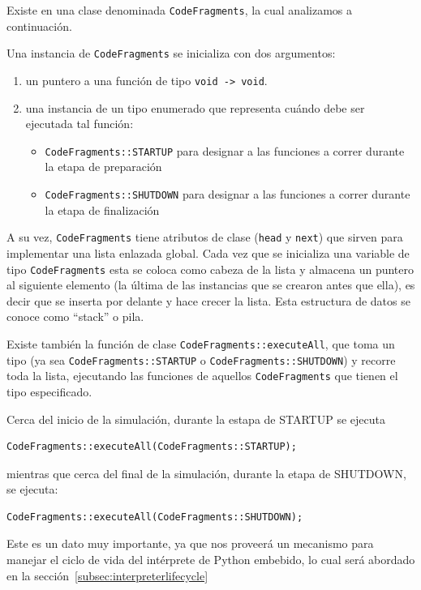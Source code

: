 \documentclass[]{article}
\begin{document}
Existe en \omnetpp{} una clase denominada \verb!CodeFragments!, la cual
analizamos a continuación.

Una instancia de \verb!CodeFragments! se inicializa con dos argumentos:

\begin{enumerate}
    \item un puntero a una función de tipo \verb!void -> void!.
    \item una instancia de un tipo enumerado que representa cuándo debe ser ejecutada tal función:
    \begin{itemize}
        \item \verb!CodeFragments::STARTUP! para designar a las funciones a correr durante la etapa de preparación
        \item \verb!CodeFragments::SHUTDOWN! para designar a las funciones a correr durante la etapa de finalización
    \end{itemize}
\end{enumerate}

A su vez, \verb!CodeFragments! tiene atributos de clase (\verb!head! y
\verb!next!) que sirven para implementar una lista enlazada global. Cada vez
que se inicializa una variable de tipo \verb!CodeFragments! esta se coloca como
cabeza de la lista y almacena un puntero al siguiente elemento (la última de
las instancias que se crearon antes que ella), es decir que se inserta por
delante y hace crecer la lista.  Esta estructura de datos se conoce como
``stack'' o pila.

Existe también la función de clase \verb!CodeFragments::executeAll!, que toma
un tipo (ya sea \verb!CodeFragments::STARTUP! o \verb!CodeFragments::SHUTDOWN!)
y recorre toda la lista, ejecutando las funciones de aquellos
\verb!CodeFragments! que tienen el tipo especificado.

Cerca del inicio de la simulación, durante la estapa de STARTUP se ejecuta

\begin{verbatim}
CodeFragments::executeAll(CodeFragments::STARTUP);
\end{verbatim}

mientras que cerca del final de la simulación, durante la etapa de SHUTDOWN, se ejecuta:

\begin{verbatim}
CodeFragments::executeAll(CodeFragments::SHUTDOWN);
\end{verbatim}

Este es un dato muy importante, ya que nos proveerá un mecanismo para manejar el ciclo de vida del intérprete de Python embebido,
lo cual será abordado en la sección~\ref{subsec:interpreterlifecycle}
\end{document}
